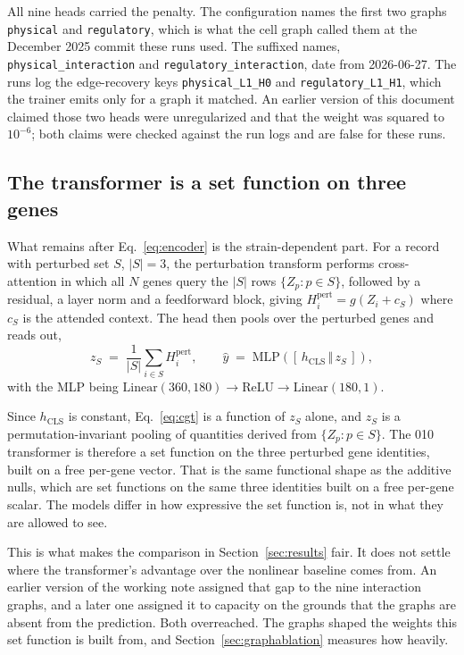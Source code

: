 All nine heads carried the penalty. The configuration names the first two graphs
\texttt{physical} and \texttt{regulatory}, which is what the cell graph called
them at the December 2025 commit these runs used. The suffixed names,
\texttt{physical\_interaction} and \texttt{regulatory\_interaction}, date from
2026-06-27. The runs log the edge-recovery keys \texttt{physical\_L1\_H0} and
\texttt{regulatory\_L1\_H1}, which the trainer emits only for a graph it
matched.
An earlier version of this document claimed those two heads were unregularized
and that the weight was squared to $10^{-6}$; both claims were checked against
the run logs and are false for these runs.

\subsection{The transformer is a set function on three genes}
\label{sec:setfunction}

What remains after Eq.~\ref{eq:encoder} is the strain-dependent part. For a
record with perturbed set $S$, $|S| = 3$, the perturbation transform performs
cross-attention in which all $N$ genes query the $|S|$ rows $\{Z_p : p \in S\}$,
followed by a residual, a layer norm and a feedforward block, giving
$H^{\mathrm{pert}}_i = g(Z_i + c_S)$ where $c_S$ is the attended context. The
head then pools over the perturbed genes and reads out,
%
\begin{equation}
  z_S \;=\; \frac{1}{|S|}\sum_{i \in S} H^{\mathrm{pert}}_i ,
  \qquad
  \hat{y} \;=\; \mathrm{MLP}\!\left([\,h_{\mathrm{CLS}} \,\Vert\, z_S\,]\right),
  \label{eq:cgt}
\end{equation}
%
with the MLP being $\mathrm{Linear}(360, 180) \to \mathrm{ReLU} \to
\mathrm{Linear}(180, 1)$.

Since $h_{\mathrm{CLS}}$ is constant, Eq.~\ref{eq:cgt} is a function of $z_S$
alone, and $z_S$ is a permutation-invariant pooling of quantities derived from
$\{Z_p : p \in S\}$. The 010 transformer is therefore a set function on the
three perturbed gene identities, built on a free per-gene vector. That is the
same functional shape as the additive nulls, which are set functions on the same
three identities built on a free per-gene scalar. The models differ in how
expressive the set function is, not in what they are allowed to see.

This is what makes the comparison in Section~\ref{sec:results} fair. It does not
settle where the transformer's advantage over the nonlinear baseline comes from.
An earlier version of the working note assigned that gap to the nine interaction
graphs, and a later one assigned it to capacity on the grounds that the graphs
are absent from the prediction. Both overreached. The graphs shaped the weights
this set function is built from, and Section~\ref{sec:graphablation} measures how
heavily.
